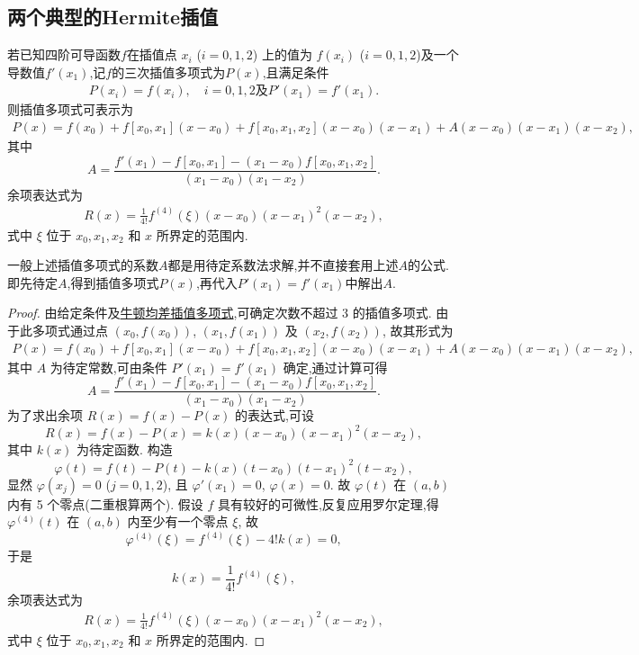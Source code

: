 \documentclass[../../main.tex]{subfiles}
\begin{document}
\subsection{两个典型的Hermite插值}

\begin{theorem}
若已知四阶可导函数$f$在插值点 $x_i$ ($i = 0, 1, 2$) 上的值为 $f(x_i)$ ($i = 0, 1, 2$)及一个导数值$f'(x_1)$,记$f$的三次插值多项式为$P(x)$,且满足条件
\begin{align*}
P(x_i) = f(x_i), \quad i = 0, 1,2\text{及}P'(x_1)=f'(x_1).
\end{align*}
则插值多项式可表示为
\begin{align*}
P(x) = f(x_0) + f[x_0, x_1](x - x_0) + f[x_0, x_1, x_2](x - x_0)(x - x_1) + A(x - x_0)(x - x_1)(x - x_2),
\end{align*}
其中\[
A = \frac{f'(x_1) - f[x_0, x_1] - (x_1 - x_0)f[x_0, x_1, x_2]}{(x_1 - x_0)(x_1 - x_2)}.
\]
余项表达式为
\begin{align}
R(x) = \frac{1}{4!}f^{(4)}(\xi)(x - x_0)(x - x_1)^2(x - x_2), \label{eq:数值分析-4.5}
\end{align}
式中 $\xi$ 位于 $x_0, x_1, x_2$ 和 $x$ 所界定的范围内.
\end{theorem}
\begin{remark}
一般上述插值多项式的系数$A$都是用待定系数法求解,并不直接套用上述$A$的公式.即先待定$A$,得到插值多项式$P(x)$,再代入$P'(x_1)=f'(x_1)$中解出$A$.
\end{remark}
\begin{proof}
由给定条件及\hyperref[theorem:牛顿均差插值多项式]{牛顿均差插值多项式},可确定次数不超过 3 的插值多项式. 由于此多项式通过点 $(x_0, f(x_0))$, $(x_1, f(x_1))$ 及 $(x_2, f(x_2))$, 故其形式为
\begin{align*}
P(x) = f(x_0) + f[x_0, x_1](x - x_0) + f[x_0, x_1, x_2](x - x_0)(x - x_1) + A(x - x_0)(x - x_1)(x - x_2),
\end{align*}
其中 $A$ 为待定常数,可由条件 $P'(x_1) = f'(x_1)$ 确定,通过计算可得
\[
A = \frac{f'(x_1) - f[x_0, x_1] - (x_1 - x_0)f[x_0, x_1, x_2]}{(x_1 - x_0)(x_1 - x_2)}.
\]
为了求出余项 $R(x) = f(x) - P(x)$ 的表达式,可设
\[
R(x) = f(x) - P(x) = k(x)(x - x_0)(x - x_1)^2(x - x_2),
\]
其中 $k(x)$ 为待定函数. 构造
\[
\varphi(t) = f(t) - P(t) - k(x)(t - x_0)(t - x_1)^2(t - x_2),
\]
显然 $\varphi(x_j) = 0$ ($j = 0, 1, 2$), 且 $\varphi'(x_1) = 0$, $\varphi(x) = 0$. 故 $\varphi(t)$ 在 $(a, b)$ 内有 5 个零点(二重根算两个). 假设 $f$ 具有较好的可微性,反复应用罗尔定理,得 $\varphi^{(4)}(t)$ 在 $(a, b)$ 内至少有一个零点 $\xi$, 故
\[
\varphi^{(4)}(\xi) = f^{(4)}(\xi) - 4!k(x) = 0,
\]
于是
\[
k(x) = \frac{1}{4!}f^{(4)}(\xi),
\]
余项表达式为
\begin{align*}
R(x) = \frac{1}{4!}f^{(4)}(\xi)(x - x_0)(x - x_1)^2(x - x_2),
\end{align*}
式中 $\xi$ 位于 $x_0, x_1, x_2$ 和 $x$ 所界定的范围内.

\end{proof}
\end{document}
